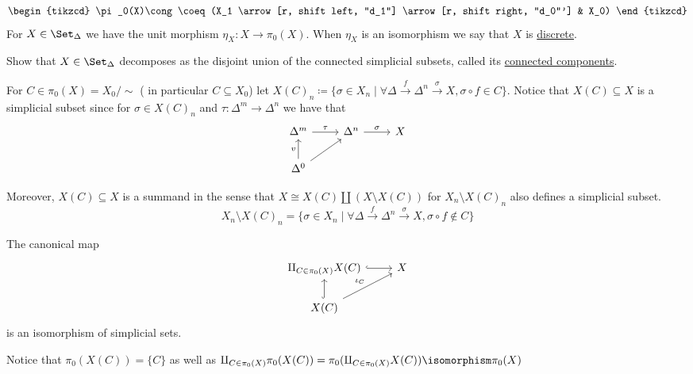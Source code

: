 \[
\begin{tikzcd}
    \pi_0(X)\cong \coeq(X_1
    \arrow[r, shift left, "d_1"]
    \arrow[r, shift right, "d_0"']
    &
    X_0)
\end{tikzcd}
\]
For $X \in \Set_{\Delta}$ we have the unit morphism $\eta_X \colon X \to \pi_0(X)$.
When $\eta_X$ is an isomorphism we say that $X$ is \underline{discrete}.


Show that $X \in  \Set_{\Delta}$ decomposes as the disjoint union of the connected simplicial subsets, called its \underline{connected components}.

\begin{constr}
    For $C \in  \pi_0(X)=X_0/\sim$ ( in particular $C \subseteq X_0$) let $X(C)_n\coloneqq \{ \sigma  \in X_n \mid \forall \Delta \xrightarrow{f}\Delta^n \xrightarrow{\sigma}X , \sigma \circ f\in C\}$.
    Notice that $X(C) \subseteq X$ is a simplicial subset since for $\sigma  \in X(C)_n$ and $\tau \colon \Delta^m \to \Delta^n$ we have that 
    \[
    \begin{tikzcd}
        \Delta^m
        \arrow[r,"\tau"]
        &
        \Delta^n
        \arrow[r,"\sigma"]
        &
        X
        \\
        \Delta^0
        \arrow[u,"v"]
        \arrow[ru]
    \end{tikzcd}    
    \]
\end{constr}

Moreover, $X(C) \subseteq X$ is a summand in the sense that $X \cong X(C) \amalg (X \setminus X(C))$ for $X_n \setminus X(C)_n$ also defines a simplicial subset.
\[
X_n\setminus X(C)_n =\{ \sigma  \in X_n \mid \forall \Delta \xrightarrow{f}\Delta^n \xrightarrow{\sigma}X,\sigma\circ f \notin C\}
\]

\begin{prop}
    The canonical map 
    \[
    \begin{tikzcd}
        \amalg_{C \in \pi_0(X)}X(C)
        \arrow[r, hook]
        &
        X
        \\
        X(C)
        \arrow[u, hook]
        \arrow[ru, "\iota_C"]
    \end{tikzcd}
    \]
    is an isomorphism of simplicial sets.
\end{prop}

\begin{rmk}
    Notice that
    $\pi_0(X(C))=\{C\}$ as well as 
    $\amalg_{C \in \pi_0(X)}\pi_0(X(C))
    =\pi_0(\amalg_{C \in \pi_0(X)}X(C)) 
    \isomorphism 
    \pi_0(X)$
\end{rmk}

